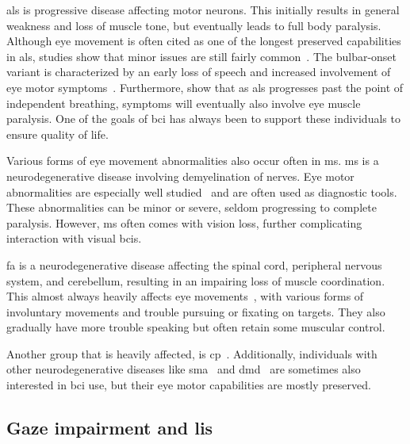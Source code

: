 \ac{als} is progressive disease affecting motor neurons.
This initially results in general weakness and loss of muscle tone, but
eventually leads to full body paralysis.
Although eye movement is often cited as one of the longest preserved
capabilities in \ac{als}, studies show that minor issues are still
fairly common~\cite{Kang2018, Guo2022,Moss2012}.
The bulbar-onset variant is characterized by an early loss of speech
and increased involvement of eye motor symptoms~\cite{Guo2022}.
Furthermore, \textcite{Hayashi1991} show that as \ac{als} progresses past
the point of independent breathing, symptoms will eventually also involve
eye muscle paralysis.
One of the goals of \ac{bci} has always been to support these individuals to
ensure quality of life.

Various forms of eye movement abnormalities also occur often in
\ac{ms}.
\Ac{ms} is a neurodegenerative disease involving demyelination of nerves.
Eye motor abnormalities are especially well
studied~\cite{Mueri1985,Prasad2010,Castelnovo2016,Serra2018,Polet2020} and
are often used as diagnostic tools.
These abnormalities can be minor or severe, seldom progressing to complete
paralysis.
However, \ac{ms} often comes with vision loss, further complicating interaction
with visual \acp{bci}.

\Ac{fa} is a neurodegenerative disease affecting the
spinal cord, peripheral nervous system, and cerebellum, resulting in an
impairing loss of muscle coordination.
This almost always heavily affects eye
movements~\cite{Fahey2008,Hocking2010,Furman1983,Cook2017}, with various forms of
involuntary movements and trouble pursuing or fixating on targets.
They also gradually have more trouble speaking but often retain some muscular
control.

Another group that is heavily affected, is \ac{cp}~\cite{Fazzi2012}.
Additionally, individuals with other neurodegenerative diseases like
\ac{sma}~\cite{Anagnostou2021} and \ac{dmd}~\cite{Lui2001} are
sometimes also interested in \ac{bci} use, but their eye motor capabilities are
mostly preserved.

\subsection{Gaze impairment and \acl{lis}}
\label{sec:gaze-independence/oculomotor/gaze}
\newcommand\fnlis{\footnote{Multiple definitions of \ac{lis} are encountered in
\ac{bci} and neurological literature.
Some definitions include only those with tetraplegy without eye movements used
for communications.
Others distinguish Complete Locked-in Syndrome (CLIS) with full body paralysis,
including no eye motor control at all, from a \ac{lis} state with some preserved eye
movements or minor motor output.
While some definitions only include stroke or \ac{tbi} with damage to
specific regions in the brain (midbrain, brainstem, or
cerebellum)~\cite{Smith2005}, it can also generally refer to the state of full body paralysis
or loss of muscle tone incurred in neurodegenerative diseases, combined with
the inability to speak, such as occurs in late-stage ALS.}}

